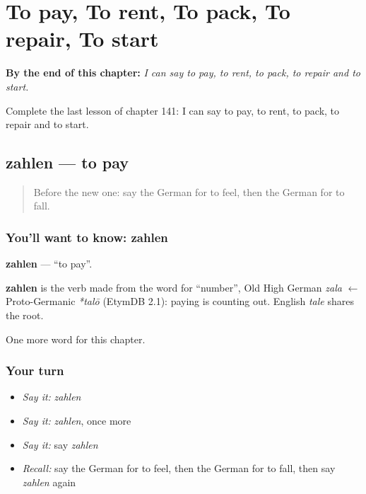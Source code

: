 
\chapter{To pay, To rent, To pack, To repair, To start}
\label{ch:ge-to-pay-to-rent-to-pack-to-repair-to-start}

\begin{chapteropening}
\textbf{By the end of this chapter:} \emph{I can say to pay, to rent, to pack, to repair and to start.}

Complete the last lesson of chapter 141: I can say to pay, to rent, to pack, to repair and to start.
\end{chapteropening}

\section[zahlen]{zahlen — to pay}

\label{lesson:GE-C141-zahlen}



\begin{quote}
Before the new one: say the German for to feel, then the German for to fall.
\end{quote}

\subsection*{You'll want to know: zahlen}
\textbf{zahlen} — \textquotedblleft{}to pay\textquotedblright{}.

\begin{cousinweb}
\textbf{zahlen} is the verb made from the word for \textquotedblleft{}number\textquotedblright{}, Old High German \emph{zala} $\leftarrow$ Proto-Germanic \emph{*talō} (EtymDB 2.1): paying is counting out. English \emph{tale} shares the root.
\end{cousinweb}

\begin{grammarlens}[title={What you've built}]
One more word for this chapter.
\end{grammarlens}

\subsection*{Your turn}
\begin{itemize}
\raggedright
  \item \emph{Say it:} \emph{zahlen}
  \item \emph{Say it:} \emph{zahlen}, once more
  \item \emph{Say it:} say \emph{zahlen}
  \item \emph{Recall:} say the German for to feel, then the German for to fall, then say \emph{zahlen} again
\end{itemize}

